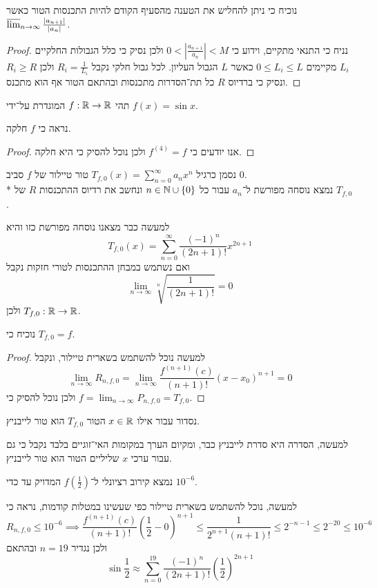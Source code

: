 \Subquestion{}
נוכיח כי ניתן להחליש את הטענה מהסעיף הקודם להיות התכנסות הטור כאשר $\operatorname*{\overline{lim}}_{n \to \infty} \frac{|a_{n + 1}|}{|a_n|}$.
\begin{proof}
	נניח כי התנאי מתקיים, וידוע כי $0 < \left\lvert \frac{a_{n + 1}}{a_n} \right\rvert < M$ ולכן נסיק כי כלל  הגבולות החלקיים $L_i$ מקיימים $0 \le L_i \le L$ כאשר $L$ הגבול העליון.
	לכל גבול חלקי נקבל $R_i = \frac{1}{L_i}$ ולכן $R_i \ge R$ ונסיק כי ברדיוס $R$ כל תת־הסדרות מתכנסות ובהתאם הטור אף הוא מתכנס.
\end{proof}

\Question{}
תהי $f : \mathbb{R} \to \mathbb{R}$ המוגדרת על־ידי $f(x) = \sin x$.

\Subquestion{}
נראה כי $f$ חלקה.
\begin{proof}
	אנו יודעים כי $f^{(4)} = f$ ולכן נוכל להסיק כי היא חלקה.
\end{proof}

\Subquestion{}
נסמן כרגיל $T_{f, 0}(x) = \sum_{n = 0}^{\infty} a_n x^n$ טור טיילור של $f$ סביב $0$. \\*
נמצא נוסחה מפורשת ל־$a_n$ עבור כל $n \in \mathbb{N} \cup \{ 0 \}$ ונחשב את רדיוס ההתכנסות $R$ של $T_{f, 0}$.

למעשה כבר מצאנו נוסחה מפורשת כזו והיא
\[
	T_{f, 0}(x) = \sum_{n = 0}^{\infty} \frac{{(-1)}^n}{(2n + 1)!} x^{2n + 1}
\]
ואם נשתמש במבחן ההתכנסות לטורי חזקות נקבל
\[
	\lim_{n \to \infty} \sqrt[n]{\frac{1}{(2n + 1)!}} = 0
\]
ולכן $T_{f, 0} : \mathbb{R} \to \mathbb{R}$.

\Subquestion{}
נוכיח כי $T_{f, 0} = f$.
\begin{proof}
	למעשה נוכל להשתמש בשארית טיילור, ונקבל
	\[
		\lim_{n \to \infty} R_{n, f, 0}
		= \lim_{n \to \infty} \frac{f^{(n + 1)}(c)}{(n + 1)!} {(x - x_0)}^{n + 1} = 0
	\]
	ולכן נוכל להסיק כי $f = \lim_{n \to \infty} P_{n, f, 0} = T_{f, 0}$.
\end{proof}

\Subquestion{}
נסדור עבור אילו $x \in \mathbb{R}$ הטור $T_{f, 0}$ הוא טור לייבניץ.

למעשה, הסדרה היא סדרת לייבניץ כבר, ומקיום הערך במקומות האי־זוגיים בלבד נקבל כי גם עבור ערכי $x$ שליליים הטור הוא טור לייבניץ.

\Subquestion{}
נמצא קירוב רציונלי ל־$f(\frac{1}{2})$ המדויק עד כדי $10^{-6}$.

למעשה, נוכל להשתמש בשארית טיילור כפי שעשינו במטלות קודמות, נראה כי
\[
	R_{n, f, 0} \le 10^{-6}
	\implies \frac{f^{(n + 1)}(c)}{(n + 1)!} {(\frac{1}{2} - 0)}^{n + 1}
	\le \frac{1}{2^{n + 1} (n + 1)!}
	\le 2^{-n - 1}
	\le 2^{-20}
	\le 10^{-6}
\]
ולכן נגדיר $n = 19$ ובהתאם
\[
	\sin \frac{1}{2} \approx \sum_{n = 0}^{19} \frac{{(-1)}^n}{(2n + 1)!} {(\frac{1}{2})}^{2n + 1}
\]

